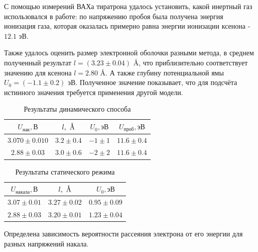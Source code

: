 \documentclass[a4paper, 12pt]{article}
\begin{document}
        С помощью измерений ВАХа тиратрона удалось установить, какой инертный газ использовался в работе: по напряжению пробоя была получена энергия ионизация газа, которая оказалась примерно равна энергии ионизации ксенона - $12.1 \text{ эВ}$.

        Также удалось оценить размер электронной оболочки разными метода, в среднем полученный результат $l = (3.23 \pm 0.04)$ \AA, что приблизительно соответствует значению для ксенона $l = 2.80$ \AA.
        А также глубину потенциальной ямы $U_0 = (- 1.1 \pm 0.2) \text{ эВ}$. Полученное значение показывает, что для подсчёта истинного значения требуется применения другой модели.

        \begin{table}[!ht]
            \centering
            \begin{tabular}{|c|c|c|c|}
                \hline

                $U_{нак}, В$ & $l, \textup{~\AA}$ & $U_0, эВ$ & $U_{проб}, эВ$\\ \hline
                $3.070 \pm 0.010$ & $3.2 \pm 0.4$ & $-1 \pm 1$ & $11.6 \pm 0.4$\\ \hline
                $2.88 \pm 0.03$ & $3.0 \pm 0.6$ & $-2 \pm 2$ & $11.6 \pm 0.4$\\ \hline

            \end{tabular}
            \caption{Результаты динамического способа}
            \label{tab:dynamic_res}
        \end{table}

        \begin{table}[!ht]
            \centering
            \begin{tabular}{|c|c|c|}
                \hline

                $U_{накала}, В$ & $l, \textup{~\AA}$ & $U_0, эВ$\\ \hline
                $3.07 \pm 0.01$ & $3.27 \pm 0.02$ & $0.95 \pm 0.09$\\ \hline
                $2.88 \pm 0.03$ & $3.20 \pm 0.01$ & $1.23 \pm 0.04$\\ \hline

            \end{tabular}
            \caption{Результаты статического режима}
            \label{}
        \end{table}

        Определена зависимость вероятности рассеяния электрона от его энергии для разных напряжений накала.
\end{document}
